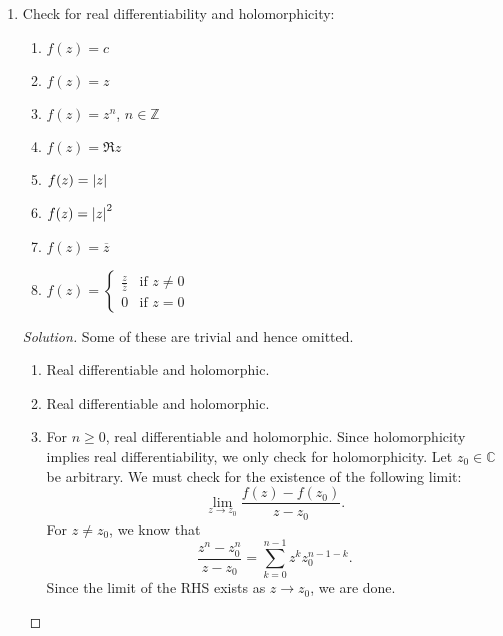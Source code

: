 \documentclass[11pt]{article}
\theoremstyle{definition}
\newenvironment{blockquote}
{\begin{mdframed}[skipabove=0pt, skipbelow=0pt, innertopmargin=4pt, innerbottommargin=4pt, bottomline=false,topline=false,rightline=false, linewidth=2pt]}
{\end{mdframed}}
\newenvironment{soln}{\begin{proof}[Solution]}{\end{proof}}
\begin{document}
\begin{enumerate}[leftmargin=*]
\begin{soln}
\begin{blockquote}
		\end{blockquote}
		
		Since $[0,1]$ is uncountable (we assume this without proof), and the images are disjoint (by claim (c)), we have that the set $\left\{ \sigma_{\lambda} \mid \lambda \in [0,1] \right\}$ is uncountable. Since the set $S$ is only countable, there exists some $\lambda_0 \in [0,1]$ such that $\sigma_{\lambda_0}(t) \notin S$ for all $t \in [0,1]$. In other words, $\sigma_{\lambda_0}$ is a path in $\mathbb{C} \setminus S$ starting at $z_1$ and ending at $z_2$. Since $z_1,z_2$ were arbitrary, we are done. \qedhere
        
    \end{soln}
    
    \item Check for real differentiability and holomorphicity:
    
    \begin{enumerate}
        \item $f(z) = c$
        \item $f(z) = z$
        \item $f(z) = z^n$, $n \in \mathbb{Z}$
        \item $f(z) = \mathfrak{R}z$
        \item $f(z) = \abs{z}$
        \item $f(z) = \abs{z}^2$
        \item $f(z) = \overline{z}$
        \item $f(z) = \begin{cases}
            \frac{z}{\overline{z}} & \text{if } z \neq 0 \\
            0 & \text{if } z = 0
        \end{cases}$
    \end{enumerate}
    \begin{soln} Some of these are trivial and hence omitted.
    \begin{enumerate}
        \item Real differentiable and holomorphic.
        \item Real differentiable and holomorphic.
        \item For $n \geq 0$, real differentiable and holomorphic. Since holomorphicity implies real differentiability, we only check for holomorphicity. Let $z_0 \in \mathbb{C}$ be arbitrary.  We must check for the existence of the following limit:
        \[
            \lim_{z \to z_0} \frac{f(z) - f(z_0)}{z-z_0}.
        \]
        For $z \neq z_0$, we know that
        \[
            \frac{z^n - z_0^n}{z-z_0} = \sum_{k=0}^{n-1} z^k z_0^{n-1-k}.
        \]
        Since the limit of the RHS exists as $z \to z_0$, we are done.
        

\end{enumerate}
\end{soln}
\end{enumerate}
\end{document}
